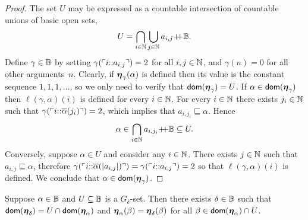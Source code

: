 \begin{proof}
  The set $U$ may be expressed as a countable intersection of countable unions of basic
  open sets,
  \begin{equation*}
    U = \bigcap_{i \in \mathbb{N}}
        \bigcup_{j \in \mathbb{N}} a_{i,j}{{+}\!\!{+}}\mathbb{B}.
  \end{equation*}
  Define $\gamma \in \mathbb{B}$ by setting
  $\gamma(\ulcorner i {:}{:} a_{i,j} \urcorner) = 2$ for all $i, j \in \mathbb{N}$,
  and $\gamma(n) = 0$ for all other arguments~$n$. Clearly, if
  $\text{\boldmath{$\eta$}}_{\gamma}(\alpha)$ is defined then its value is the constant
  sequence $1, 1, 1, \ldots$, so we only need to verify that
  $\mathsf{dom}(\text{\boldmath{$\eta$}}_\gamma) = U$. If $\alpha \in \mathsf{dom}(\text{\boldmath{$\eta$}}_\gamma)$ then
  $\ell(\gamma,\alpha)(i)$ is defined for every $i \in \mathbb{N}$.
  For every $i \in \mathbb{N}$ there exists $j_i \in \mathbb{N}$ such that $\gamma
  (\ulcorner i {:}{:} \overline{\alpha}(j_i) \urcorner) = 2$, which implies that $
  a_{i, j_i} \sqsubseteq \alpha$. Hence
  \begin{equation*}
    \alpha \in \bigcap_{i \in \mathbb{N}} a_{i, j_i}{{+}\!\!{+}}\mathbb{B} \subseteq U.
  \end{equation*}
  Conversely, suppose $\alpha \in U$ and consider any $i \in \mathbb{N}$.
  There exists $j \in \mathbb{N}$ such that $a_{i,j} \sqsubseteq \alpha$,
  therefore $\gamma (\ulcorner i {:}{:} \overline{\alpha}(|a_{i,j}|) \urcorner) =
  \gamma(\ulcorner i {:}{:} a_{i,j} \urcorner) = 2$ so that $\ell(\gamma,\alpha)(i)$ is defined. We conclude that $\alpha \in
  \mathsf{dom}(\text{\boldmath{$\eta$}}_\gamma)$.
\end{proof}

\begin{lemma}
  \label{th:restrict_G_delta}%
  Suppose $\alpha \in \mathbb{B}$ and $U \subseteq \mathbb{B}$ is a $G_\delta$-set.
  Then there exists $\delta \in \mathbb{B}$ such that
  $\mathsf{dom}(\text{\boldmath{$\eta$}}_\delta) = U \cap \mathsf{dom}(\text{\boldmath{$\eta$}}_\alpha)$
  and
  $\text{\boldmath{$\eta$}}_{\alpha}(\beta) = \text{\boldmath{$\eta$}}_{\delta}(\beta)$
  for all $\beta \in \mathsf{dom}(\text{\boldmath{$\eta$}}_\alpha) \cap U$.
\end{lemma}


